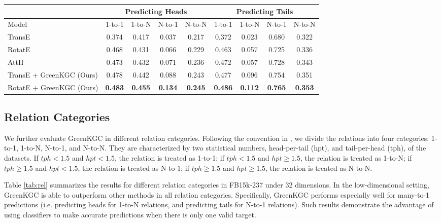 \documentclass{article}
\begin{document}
\begin{table*}[!t]
\color{black}
\setlength\tabcolsep{3pt}
\centering
\begin{tabular}{l | c  c  c  c | c  c  c  c }
\hline
& \multicolumn{4}{c|}{\textbf{Predicting Heads}} & \multicolumn{4}{c}{\textbf{Predicting Tails}} \\
\hline
Model & 1-to-1 & 1-to-N & N-to-1 & N-to-N & 1-to-1 & 1-to-N & N-to-1 & N-to-N \\
\hline
TransE \cite{bordes2013translating}  &0.374 &0.417 &0.037 &0.217 &0.372 &0.023 &0.680 &0.322\\
RotatE \cite{sun2018rotate}          &0.468 &0.431 &0.066 &0.229 &0.463 &0.057 &0.725 &0.336\\
AttH \cite{chami2020low}             &0.473 &0.432 &0.071 &0.236 &0.472 &0.057 &0.728 &0.343\\ 
\hline
TransE + GreenKGC (Ours)     &0.478 &0.442 &0.088 &0.243 &0.477 &0.096 &0.754 &0.351\\
RotatE + GreenKGC (Ours)     &\textbf{0.483} &\textbf{0.455} &\textbf{0.134} &\textbf{0.245} &\textbf{0.486} &\textbf{0.112} &\textbf{0.765} &\textbf{0.353}\\
\hline
\end{tabular}
\caption{Performance on different relation categories in FB15k-237 under 32 dimensions.}
\label{tab:rel}
\end{table*}


{\color{black}
\subsection{Relation Categories}
We further evaluate GreenKGC in different relation categories. Following the 
convention in \citet{wang2014knowledge}, we divide the relations into four
categories: 1-to-1, 1-to-N, N-to-1, and N-to-N. They are characterized by two
statistical numbers, head-per-tail (hpt), and tail-per-head (tph), of the datasets.
If $tph < 1.5$ and $hpt < 1.5$, the relation is treated as 1-to-1;
if $tph < 1.5$ and $hpt \geq 1.5$, the relation is treated as 1-to-N;
if $tph \geq 1.5$ and $hpt < 1.5$, the relation is treated as N-to-1;
if $tph \geq 1.5$ and $hpt \geq 1.5$, the relation is treated as N-to-N.

Table \ref{tab:rel} summarizes the results for different relation categories in
FB15k-237 under 32 dimensions. In the low-dimensional setting, GreenKGC is able to outperform
other methods in all relation categories. Specifically, GreenKGC performs especially 
well for many-to-1 predictions (i.e. predicting heads for 1-to-N relations, and predicting
tails for N-to-1 relations). Such results demonstrate the advantage of using classifiers 
to make accurate predictions when there is only one valid target.
}
\end{document}
